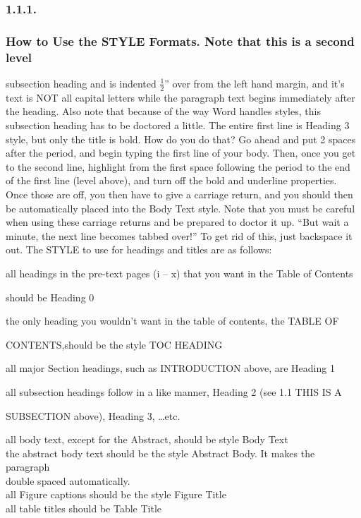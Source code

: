 \documentclass{article}
\newcommand{\tab}{\hspace{5mm}}
\begin{document}
\subsubsection*{1.1.1.\tab }


\subsubsection*{
How to Use the STYLE Formats. Note that this is a second level}

subsection heading and is indented \ensuremath{\frac12}'' over from the 
left hand margin, and it's text is NOT all capital letters while 
the paragraph text begins immediately after the heading. Also 
note that because of the way Word handles styles, this subsection 
heading has to be doctored a little. The entire first line is 
Heading 3 style, but only the title is bold. How do you do that? 
Go ahead and put 2 spaces after the period, and begin typing 
the first line of your body. Then, once you get to the second 
line, highlight from the first space following the period to 
the end of the first line (level above), and turn off the bold 
and underline properties. Once those are off, you then have to 
give a carriage return, and you should then be automatically 
placed into the Body Text style. Note that you must be careful 
when using these carriage returns and be prepared to doctor it 
up. ``But wait a minute, the next line becomes tabbed over!'' 
To get rid of this, just backspace it out. The STYLE to use for 
headings and titles are as follows: 


\tab all headings in the pre-text pages (i -- x) that you want in the 
Table of Contents 


should be Heading 0


\tab the only heading you wouldn't want in the table of contents, 
the TABLE OF 


CONTENTS,\tab should be the style TOC HEADING


all major Section headings, such as INTRODUCTION above, are Heading 
1


\tab all subsection headings follow in a like manner, Heading 2 (see 
1.1 THIS IS A 


SUBSECTION above), Heading 3, \dots etc.


\tab all body text, except for the Abstract, should be style Body 
Text\\
\tab the abstract body text should be the style Abstract Body. It 
makes the paragraph\\
\tab \tab double spaced automatically.\\
\tab all Figure captions should be the style Figure Title\\
\tab all table titles should be Table Title\\
\end{document}
